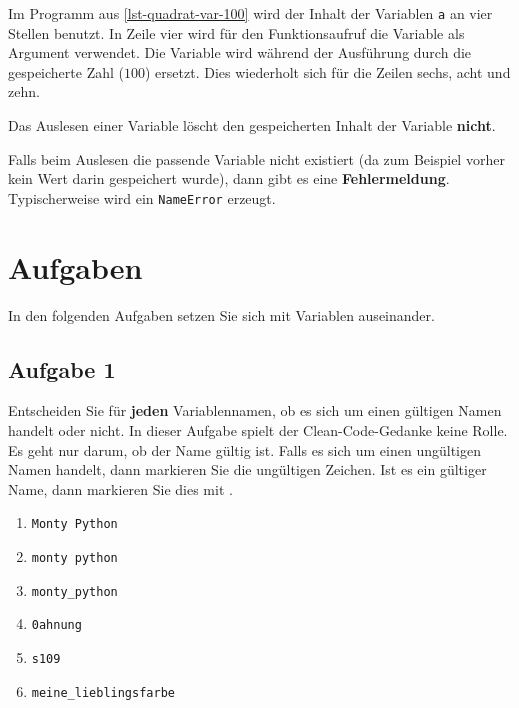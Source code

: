 \begin{example}
	Im Programm aus \autoref{lst-quadrat-var-100} wird der Inhalt der Variablen \lstinline{a} an vier Stellen benutzt. In Zeile vier wird für den Funktionsaufruf die Variable als Argument verwendet. Die Variable wird während der Ausführung durch die gespeicherte Zahl ($100$) ersetzt. Dies wiederholt sich für die Zeilen sechs, acht und zehn.
\end{example}

\begin{important}
	Das Auslesen einer Variable löscht den gespeicherten Inhalt der Variable \textbf{nicht}.
\end{important}

\begin{hinweis}
	Falls beim Auslesen die passende Variable nicht existiert (da zum Beispiel vorher kein Wert darin gespeichert wurde), dann gibt es eine \textbf{Fehlermeldung}. Typischerweise wird ein \texttt{NameError} erzeugt.
\end{hinweis}


\section{Aufgaben}

In den folgenden Aufgaben setzen Sie sich mit Variablen auseinander.

\subsection{Aufgabe 1}

Entscheiden Sie für \textbf{jeden} Variablennamen, ob es sich um einen gültigen Namen handelt oder nicht. In dieser Aufgabe spielt der Clean-Code-Gedanke keine Rolle. Es geht nur darum, ob der Name gültig ist. Falls es sich um einen ungültigen Namen handelt, dann markieren Sie die ungültigen Zeichen. Ist es ein gültiger Name, dann markieren Sie dies mit \checkmark.

\begin{multicols}{2}
\begin{enumerate}
\item \lstinline{Monty Python}
\item \lstinline{monty python}
\item \lstinline{monty_python}
\item \lstinline{0ahnung}
\item \lstinline{s109}
\item \lstinline{meine_lieblingsfarbe}
\end{enumerate}
\end{multicols}

